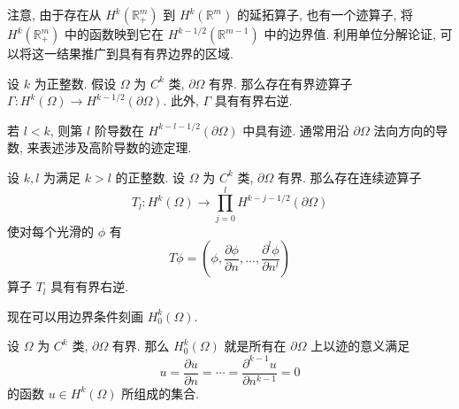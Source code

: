 注意, 由于存在从 $H^k(\mathbb{R}_+^m)$ 到 $H^k(\mathbb{R}^m)$ 的延拓算子, 也有一个迹算子, 将 $H^k(\mathbb{R}_+^m)$ 中的函数映到它在 $H^{k-1/2}(\mathbb{R}^{m-1})$ 中的边界值. 利用单位分解论证, 可以将这一结果推广到具有有界边界的区域.

\begin{Theorem}
\label{thm:smooth-domain-trace-and-right-inverse}
设 $k$ 为正整数. 假设 $\Omega$ 为 $C^k$ 类, $\partial\Omega$ 有界. 那么存在有界迹算子 $\Gamma:H^k(\Omega)\to H^{k-1/2}(\partial\Omega)$. 此外, $\Gamma$ 具有有界右逆.
\end{Theorem}

若 $l<k$, 则第 $l$ 阶导数在 $H^{k-l-1/2}(\partial\Omega)$ 中具有迹. 通常用沿 $\partial\Omega$ 法向方向的导数, 来表述涉及高阶导数的迹定理.

\begin{Theorem}
\label{thm:domain-higher-normal-trace}
设 $k,l$ 为满足 $k>l$ 的正整数. 设 $\Omega$ 为 $C^k$ 类, $\partial\Omega$ 有界. 那么存在连续迹算子
\begin{equation}\label{eq:domain-higher-normal-trace-product-map}
T_l:H^k(\Omega)\to\prod_{j=0}^lH^{k-j-1/2}(\partial\Omega)
\end{equation}
使对每个光滑的 $\phi$ 有
\begin{equation}\label{eq:domain-higher-normal-trace-smooth-values}
T\phi=\left(\phi,\dfrac{\partial\phi}{\partial n},\ldots,\dfrac{\partial^l\phi}{\partial n^l}\right)
\end{equation}
算子 $T_l$ 具有有界右逆.
\end{Theorem}

现在可以用边界条件刻画 $H_0^k(\Omega)$.

\begin{Theorem}
\label{thm:zero-boundary-sobolev-characterization}
设 $\Omega$ 为 $C^k$ 类, $\partial\Omega$ 有界. 那么 $H_0^k(\Omega)$ 就是所有在 $\partial\Omega$ 上以迹的意义满足
\begin{equation}\label{eq:zero-boundary-sobolev-normal-trace-characterization}
u=\dfrac{\partial u}{\partial n}=\cdots=\dfrac{\partial^{k-1}u}{\partial n^{k-1}}=0
\end{equation}
的函数 $u\in H^k(\Omega)$ 所组成的集合.
\end{Theorem}

